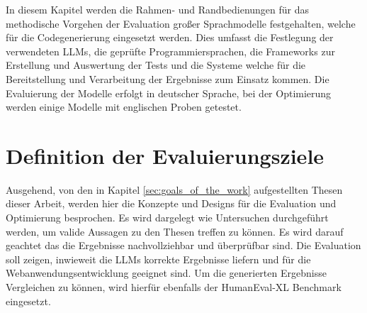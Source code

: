 In diesem Kapitel werden die Rahmen- und Randbedienungen für das methodische Vorgehen der Evaluation großer Sprachmodelle festgehalten, welche für die Codegenerierung eingesetzt werden. Dies umfasst die Festlegung der verwendeten LLMs, die geprüfte Programmiersprachen, die Frameworks zur Erstellung und Auswertung der Tests und die Systeme welche für die Bereitstellung und Verarbeitung der Ergebnisse zum Einsatz kommen. Die Evaluierung der Modelle erfolgt in deutscher Sprache, bei der Optimierung werden einige Modelle mit englischen Proben getestet.



\section{Definition der Evaluierungsziele}
Ausgehend, von den in Kapitel \ref{sec:goals_of_the_work} aufgestellten Thesen dieser Arbeit, werden hier die Konzepte und Designs für die Evaluation und Optimierung besprochen. Es wird dargelegt wie Untersuchen durchgeführt werden, um valide Aussagen zu den Thesen treffen zu können. Es wird darauf geachtet das die Ergebnisse nachvollziehbar und überprüfbar sind.
Die Evaluation soll zeigen, inwieweit die LLMs korrekte Ergebnisse liefern und für die Webanwendungsentwicklung geeignet sind. Um die generierten Ergebnisse Vergleichen zu können, wird hierfür ebenfalls der HumanEval-XL Benchmark eingesetzt.\vspace{0.2cm} 

